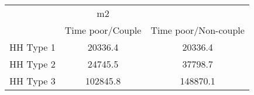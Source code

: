\begin{tabular}{l*{2}{c}}
\hline\hline
            &          m2&            \\
            &Time poor/Couple&Time poor/Non-couple\\
\hline
HH Type 1   &     20336.4&     20336.4\\
HH Type 2   &     24745.5&     37798.7\\
HH Type 3   &    102845.8&    148870.1\\
\hline\hline
\end{tabular}
